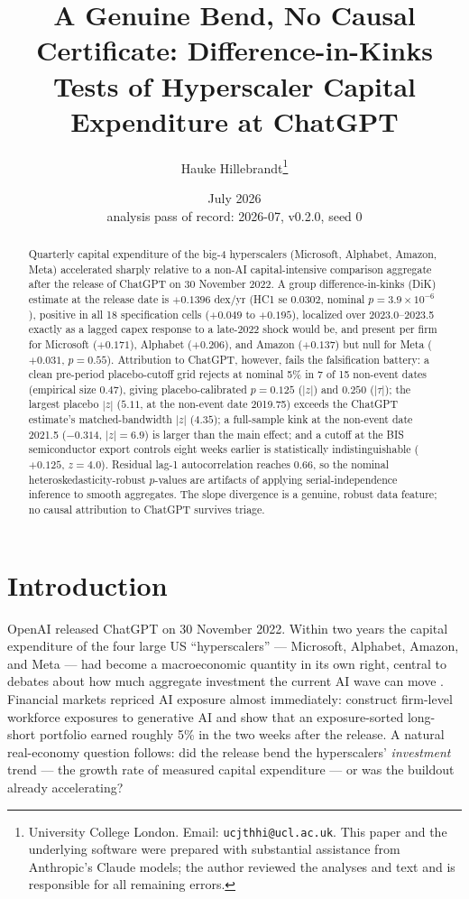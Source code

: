 \documentclass[11pt]{article}
\title{A Genuine Bend, No Causal Certificate: Difference-in-Kinks Tests of
Hyperscaler Capital Expenditure at ChatGPT}
\author{Hauke Hillebrandt\thanks{University College London. Email:
\texttt{ucjthhi@ucl.ac.uk}. This paper and the underlying \natex{} software were
prepared with substantial assistance from Anthropic's Claude models; the author
reviewed the analyses and text and is responsible for all remaining errors.}}
\date{July 2026 \\ \small analysis pass of record: 2026-07, \natex{} v0.2.0, seed 0}
\begin{document}
\maketitle

\begin{abstract}
\noindent Quarterly capital expenditure of the big-4 hyperscalers (Microsoft,
Alphabet, Amazon, Meta) accelerated sharply relative to a non-AI
capital-intensive comparison aggregate after the release of ChatGPT on 30
November 2022. A group difference-in-kinks (DiK) estimate at the release date
is $+0.1396$ dex/yr (HC1 se $0.0302$, nominal $p=3.9\times10^{-6}$), positive
in all 18 specification cells ($+0.049$ to $+0.195$), localized over
2023.0--2023.5 exactly as a lagged capex response to a late-2022 shock would
be, and present per firm for Microsoft ($+0.171$), Alphabet ($+0.206$), and
Amazon ($+0.137$) but null for Meta ($+0.031$, $p=0.55$). Attribution to
ChatGPT, however, fails the falsification battery: a clean pre-period
placebo-cutoff grid rejects at nominal 5\% in 7 of 15 non-event dates
(empirical size $0.47$), giving placebo-calibrated $p=0.125$ ($|z|$) and
$0.250$ ($|\tau|$); the largest placebo $|z|$ ($5.11$, at the non-event date
2019.75) exceeds the ChatGPT estimate's matched-bandwidth $|z|$ ($4.35$); a
full-sample kink at the non-event date 2021.5 ($-0.314$, $|z|=6.9$) is larger
than the main effect; and a cutoff at the BIS semiconductor export controls
eight weeks earlier is statistically indistinguishable ($+0.125$, $z=4.0$).
Residual lag-1 autocorrelation reaches $0.66$, so the nominal
heteroskedasticity-robust $p$-values are artifacts of applying
serial-independence inference to smooth aggregates. The slope divergence is a
genuine, robust data feature; no causal attribution to ChatGPT survives
triage.
\end{abstract}

\section{Introduction}\label{sec:intro}

OpenAI released ChatGPT on 30 November 2022. Within two years the capital
expenditure of the four large US ``hyperscalers'' --- Microsoft, Alphabet,
Amazon, and Meta --- had become a macroeconomic quantity in its own right,
central to debates about how much aggregate investment the current AI wave can
move \cite{acemoglu2025}. Financial markets repriced AI exposure almost
immediately: \cite{eisfeldt2023} construct firm-level workforce exposures to
generative AI and show that an exposure-sorted long-short portfolio earned
roughly 5\% in the two weeks after the release. A natural real-economy
question follows: did the release bend the hyperscalers' \emph{investment}
trend --- the growth rate of measured capital expenditure --- or was the
buildout already accelerating?
\end{document}
